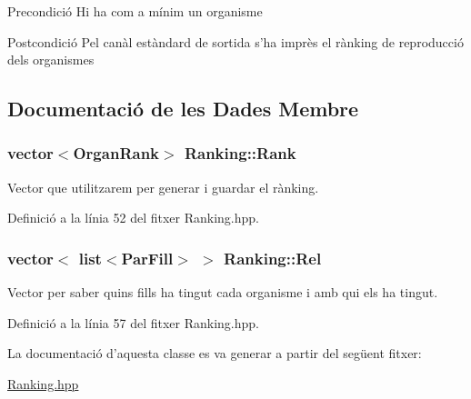 \begin{DoxyPrecond}{Precondició}
Hi ha com a mínim un organisme 
\end{DoxyPrecond}
\begin{DoxyPostcond}{Postcondició}
Pel canàl estàndard de sortida s'ha imprès el rànking de reproducció dels organismes 
\end{DoxyPostcond}


\subsection{Documentació de les Dades Membre}
\hypertarget{class_ranking_a23ba29c13cb5ac32d3fc97252f20afde}{
\subsubsection[{Rank}]{\setlength{\rightskip}{0pt plus 5cm}vector$<${\bf Organ\-Rank}$>$ Ranking\-::\-Rank\hspace{0.3cm}{\ttfamily [private]}}}\label{class_ranking_a23ba29c13cb5ac32d3fc97252f20afde}


Vector que utilitzarem per generar i guardar el rànking. 



Definició a la línia 52 del fitxer Ranking.\-hpp.

\hypertarget{class_ranking_a714b5b8881dccd99dad7e58b81ce7769}{
\subsubsection[{Rel}]{\setlength{\rightskip}{0pt plus 5cm}vector$<$ list$<${\bf Par\-Fill}$>$ $>$ Ranking\-::\-Rel\hspace{0.3cm}{\ttfamily [private]}}}\label{class_ranking_a714b5b8881dccd99dad7e58b81ce7769}


Vector per saber quins fills ha tingut cada organisme i amb qui els ha tingut. 



Definició a la línia 57 del fitxer Ranking.\-hpp.



La documentació d'aquesta classe es va generar a partir del següent fitxer\-:\begin{DoxyCompactItemize}
\item 
\hyperlink{_ranking_8hpp}{Ranking.\-hpp}\end{DoxyCompactItemize}

